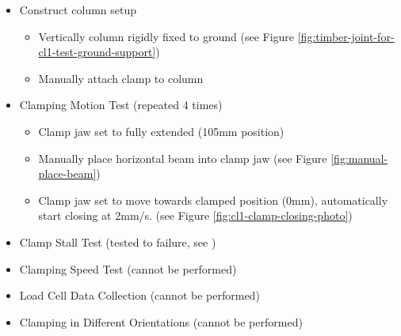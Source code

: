 \begin{samepage}
\begin{itemize}
    \item Construct column setup
    \begin{itemize}[nosep]
        \item Vertically column rigidly fixed to ground (see Figure \ref{fig:timber-joint-for-cl1-test-ground-support})
        \item Manually attach clamp to column
    \end{itemize}
    \item Clamping Motion Test (repeated 4 times)
    \begin{itemize}[nosep]
        \item Clamp jaw set to fully extended (105mm position)
        \item Manually place horizontal beam into clamp jaw (see Figure \ref{fig:manual-place-beam})
        \item Clamp jaw set to move towards clamped position (0mm), automatically start closing at 2mm/s. (see Figure \ref{fig:cl1-clamp-closing-photo})
    \end{itemize}
    \item Clamp Stall Test (tested to failure, see )
    \item Clamping Speed Test (cannot be performed)
    \item Load Cell Data Collection (cannot be performed)
    \item Clamping in Different Orientations (cannot be performed)
\end{itemize}
\end{samepage}

